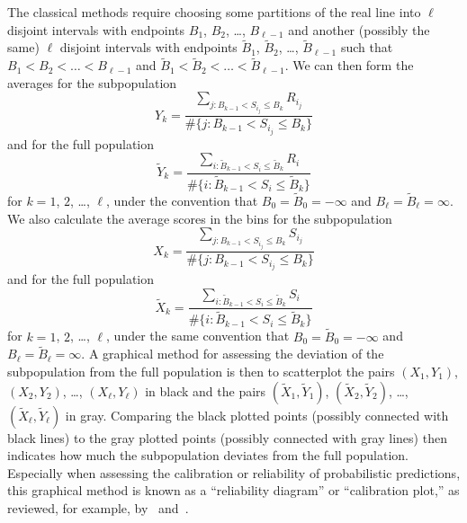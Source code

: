 \documentclass{article}
\begin{document}
The classical methods require choosing some partitions of the real line
into $\ell$ disjoint intervals with endpoints $B_1$, $B_2$, \dots, $B_{\ell-1}$
and another (possibly the same) $\ell$ disjoint intervals with endpoints
$\tilde{B}_1$, $\tilde{B}_2$, \dots, $\tilde{B}_{\ell-1}$
such that $B_1 < B_2 < \dots < B_{\ell-1}$
and $\tilde{B}_1 < \tilde{B}_2 < \dots < \tilde{B}_{\ell-1}$.
We can then form the averages for the subpopulation
%
\begin{equation}
\label{subY}
Y_k = \frac{\sum_{j : B_{k-1} < S_{i_j} \le B_k} R_{i_j}}
           {\#\{j : B_{k-1} < S_{i_j} \le B_k\}}
\end{equation}
%
and for the full population
%
\begin{equation}
\label{fullY}
\tilde{Y}_k = \frac{\sum_{i : \tilde{B}_{k-1} < S_i \le \tilde{B}_k} R_i}
                   {\#\{i : \tilde{B}_{k-1} < S_i \le \tilde{B}_k\}}
\end{equation}
%
for $k = 1$, $2$, \dots, $\ell$,
under the convention that $B_0 = \tilde{B}_0 = -\infty$
and $B_{\ell} = \tilde{B}_{\ell} = \infty$.
We also calculate the average scores in the bins for the subpopulation
%
\begin{equation}
\label{subX}
X_k = \frac{\sum_{j : B_{k-1} < S_{i_j} \le B_k} S_{i_j}}
           {\#\{j : B_{k-1} < S_{i_j} \le B_k\}}
\end{equation}
%
and for the full population
%
\begin{equation}
\label{fullX}
\tilde{X}_k = \frac{\sum_{i : \tilde{B}_{k-1} < S_i \le \tilde{B}_k} S_i}
                   {\#\{i : \tilde{B}_{k-1} < S_i \le \tilde{B}_k\}}
\end{equation}
%
for $k = 1$, $2$, \dots, $\ell$,
under the same convention that $B_0 = \tilde{B}_0 = -\infty$
and $B_{\ell} = \tilde{B}_{\ell} = \infty$.
A graphical method for assessing the deviation of the subpopulation
from the full population is then to scatterplot the pairs
$(X_1, Y_1)$, $(X_2, Y_2)$, \dots, $(X_{\ell}, Y_{\ell})$ in black
and the pairs $(\tilde{X}_1, \tilde{Y}_1)$, $(\tilde{X}_2, \tilde{Y}_2)$,
\dots, $(\tilde{X}_{\ell}, \tilde{Y}_{\ell})$ in gray.
Comparing the black plotted points (possibly connected with black lines)
to the gray plotted points (possibly connected with gray lines)
then indicates how much the subpopulation deviates from the full population.
Especially when assessing the calibration or reliability
of probabilistic predictions, this graphical method is known
as a ``reliability diagram'' or ``calibration plot,''
as reviewed, for example, by~\cite{corbett-davies-pierson-feller-goel-huq}
and~\cite{crowson-atkinson-therneau}.
\end{document}
